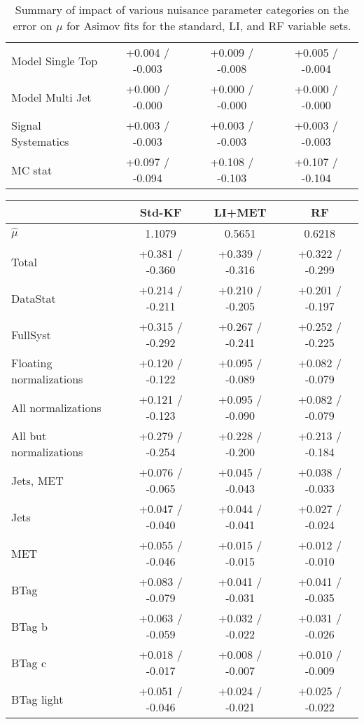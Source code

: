 \begin{enumeate}
\begin{table}[!htbp]
\begin{center}
\begin{tabular}{lccc}
Model Single Top &  +0.004 / -0.003  &  +0.009 / -0.008  &  +0.005 / -0.004 \\
Model Multi Jet &  +0.000 / -0.000  &  +0.000 / -0.000  &  +0.000 / -0.000 \\
Signal Systematics &  +0.003 / -0.003  &  +0.003 / -0.003  &  +0.003 / -0.003 \\
MC stat &  +0.097 / -0.094  &  +0.108 / -0.103  &  +0.107 / -0.104 \\
\hline\hline
\end{tabular}
\end{center}
\caption{Summary of impact of various nuisance parameter categories on the error on $\mu$ for Asimov fits for the standard, LI, and RF variable sets.}
\label{tab:asibdvz}
\end{table}

\begin{table}[!htbp]
\begin{center}
\begin{tabular}{lccc}
\hline\hline
 &Std-KF &LI+MET &RF\\
\hline
$\hat{\mu}$ & 1.1079 & 0.5651 & 0.6218\\
\hline
Total &  +0.381 / -0.360  &  +0.339 / -0.316  &  +0.322 / -0.299 \\
\hline
DataStat &  +0.214 / -0.211  &  +0.210 / -0.205  &  +0.201 / -0.197 \\
FullSyst &  +0.315 / -0.292  &  +0.267 / -0.241  &  +0.252 / -0.225 \\
Floating normalizations &  +0.120 / -0.122  &  +0.095 / -0.089  &  +0.082 / -0.079 \\
All normalizations &  +0.121 / -0.123  &  +0.095 / -0.090  &  +0.082 / -0.079 \\
All but normalizations &  +0.279 / -0.254  &  +0.228 / -0.200  &  +0.213 / -0.184 \\
\hline
Jets, MET &  +0.076 / -0.065  &  +0.045 / -0.043  &  +0.038 / -0.033 \\
Jets &  +0.047 / -0.040  &  +0.044 / -0.041  &  +0.027 / -0.024 \\
MET &  +0.055 / -0.046  &  +0.015 / -0.015  &  +0.012 / -0.010 \\
BTag &  +0.083 / -0.079  &  +0.041 / -0.031  &  +0.041 / -0.035 \\
BTag b &  +0.063 / -0.059  &  +0.032 / -0.022  &  +0.031 / -0.026 \\
BTag c &  +0.018 / -0.017  &  +0.008 / -0.007  &  +0.010 / -0.009 \\
BTag light &  +0.051 / -0.046  &  +0.024 / -0.021  &  +0.025 / -0.022 \\

\end{tabular}
\end{center}
\end{table}
\end{enumeate}
